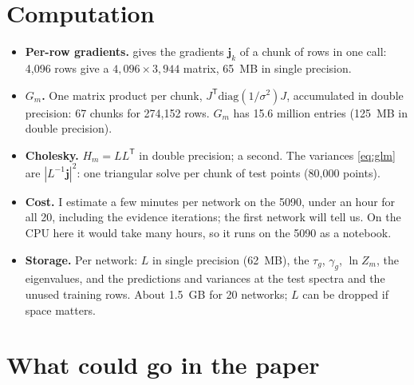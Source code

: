 \section{Computation}
\label{sec:computation}

\begin{itemize}
  \item \textbf{Per-row gradients.}  gives the
    gradients $\boldsymbol{j}_k$ of a chunk of rows in one call: 4,096 rows give a
    $4{,}096\times3{,}944$ matrix, 65~MB in single precision.
  \item \textbf{$G_m$.} One matrix product per chunk, $J^{\mathsf T} \mathrm{diag}(1/\sigma^2)
    J$, accumulated in double precision: 67 chunks for 274,152 rows. $G_m$ has 15.6 million
    entries (125~MB in double precision).
  \item \textbf{Cholesky.} $H_m = LL^{\mathsf T}$ in double precision; a second. The
    variances \cref{eq:glm} are $|L^{-1}\boldsymbol{j}|^2$: one triangular solve per chunk of
    test points (80,000 points).
  \item \textbf{Cost.} I estimate a few minutes per network on the 5090, under an hour for
    all 20, including the evidence iterations; the first network will tell us. On the CPU
    here it would take many hours, so it runs on the 5090 as a notebook.
  \item \textbf{Storage.} Per network: $L$ in single precision (62~MB), the $\tau_g$,
    $\gamma_g$, $\ln Z_m$, the eigenvalues, and the predictions and variances at the test
    spectra and the unused training rows. About 1.5~GB for 20 networks; $L$ can be dropped
    if space matters.
\end{itemize}

\section{What could go in the paper}
\label{sec:paper}

